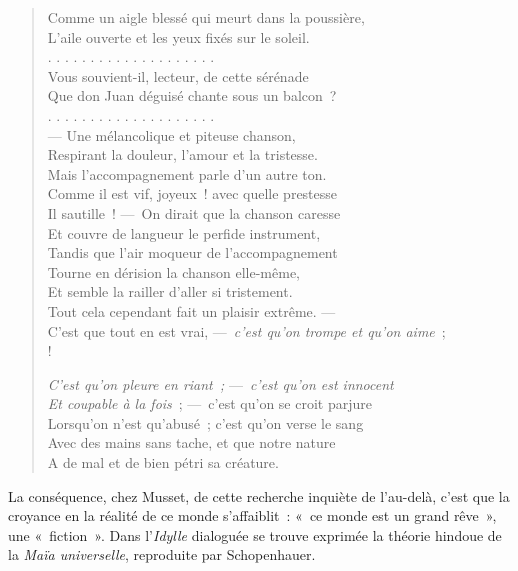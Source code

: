\documentclass[french,twoside]{book} %
\def\mednobreak{\ifdim\lastskip<\medskipamount
  \removelastskip\nopagebreak\medskip\fi}
\newcommand{\labelblock}[1]{\medbreak{\noindent\color{rubric}\bfseries #1}\par\mednobreak}
\newenvironment{quoteblock}%
  {\begin{quoting}}
  {\end{quoting}}
\newenvironment{quotebar}{%
    \def\FrameCommand{{\color{rubric!10!}\vrule width 0.5em} \hspace{0.9em}}%
    \def\OuterFrameSep{\itemsep} %
    \MakeFramed {\advance\hsize-\width \FrameRestore}
  }%
  {%
    \endMakeFramed
  }
\renewenvironment{quoteblock}%
  {%
    \savenotes
    \setstretch{0.9}
    \normalfont
    \begin{quotebar}
  }
  {%
    \end{quotebar}
    \spewnotes
  }
\begin{document}
\begin{verse}
Comme un aigle blessé qui meurt dans la poussière,\\
L’aile ouverte et les yeux fixés sur le soleil.\\
. . . . . . . . . . . . . . . . . . . .\\
Vous souvient-il, lecteur, de cette sérénade\\
Que don Juan déguisé chante sous un balcon ?\\
. . . . . . . . . . . . . . . . . . . .\\
— Une mélancolique et piteuse chanson,\\
Respirant la douleur, l’amour et la tristesse.\\
Mais l’accompagnement parle d’un autre ton.\\
Comme il est vif, joyeux ! avec quelle prestesse\\
Il sautille ! — On dirait que la chanson caresse\\
Et couvre de langueur le perfide instrument,\\
Tandis que l’air moqueur de l’accompagnement\\
Tourne en dérision la chanson elle-même,\\
Et semble la railler d’aller si tristement.\\
Tout cela cependant fait un plaisir extrême. —\\
C’est que tout en est vrai, — \emph{c’est qu’on trompe et qu’on aime} ;\\!

\emph{C’est qu’on pleure en riant ; }— \emph{c’est qu’on est innocent}\\
\emph{Et coupable à la fois} ; — c’est qu’on se croit parjure\\
Lorsqu’on n’est qu’abusé ; c’est qu’on verse le sang\\
Avec des mains sans tache, et que notre nature\\
A de mal et de bien pétri sa créature.\\
\end{verse}

\noindent La conséquence, chez Musset, de cette recherche inquiète de l’au-delà, c’est que la croyance en la réalité de ce monde s’affaiblit : « ce monde est un grand rêve », une « fiction ». Dans l’\emph{Idylle} dialoguée se trouve exprimée la théorie hindoue de la \emph{Maïa universelle}, reproduite par Schopenhauer.\par

\begin{quoteblock}

\labelblock{ALBERT}

\end{quoteblock}
\end{document}
